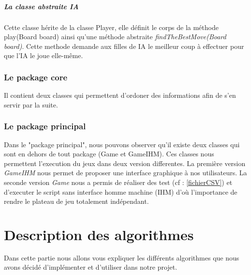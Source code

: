 \documentclass{report}
\begin{document}
              \paragraph{La classe abstraite IA}
              Cette classe hérite de la classe Player, elle définit le corps de la méthode play(Board board) ainsi qu'une méthode abstraite \textit{findTheBestMove(Board board)}.
              Cette methode demande aux filles de IA le meilleur coup à effectuer pour que l'IA le joue elle-même.

			\subsection{Le package core}\label{pckCore}
			Il contient deux classes qui permettent d'ordoner des informations afin de s'en servir par la suite.

			\subsection{Le package principal}
			Dans le "package principal", nous pouvons observer qu'il existe deux classes qui sont en dehors de tout package (Game et GameIHM).
			Ces classes nous permettent l'execution du jeux dans deux version differentes.
			La première version \textit{GameIHM} nous permet de proposer une interface graphique à nos utilisateurs.
			La seconde version \textit{Game} nous a permis de réaliser des test (cf : \ref{fichierCSV}) et d'executer le script sans
			interface homme machine (IHM) d'où l'importance de rendre le plateau de jeu totalement indépendant.
			
	\chapter{Description des algorithmes}
	Dans cette partie nous allons vous expliquer les différents algorithmes que nous avons décidé d'implémenter et d'utiliser dans notre projet.
\end{document}
